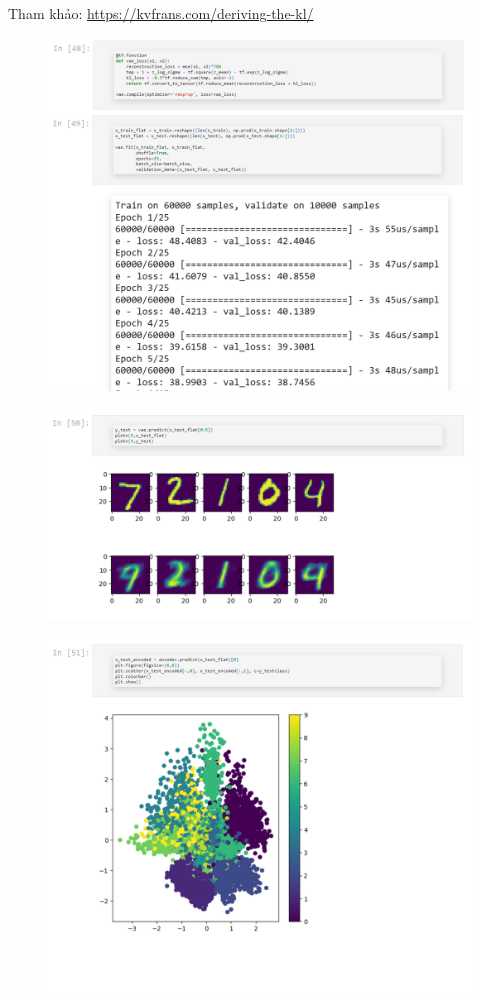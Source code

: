 \documentclass{book}
\begin{document}
Tham khảo: \href{https://kvfrans.com/deriving-the-kl/}{https://kvfrans.com/deriving-the-kl/}
\begin{figure}[H]
	\centering
	\includegraphics[width=0.75\linewidth]{images/au22.png}
\end{figure}
\begin{figure}[H]
	\centering
	\includegraphics[width=0.75\linewidth]{images/au23.png}
\end{figure}
\begin{figure}[H]
	\centering
	\includegraphics[width=0.75\linewidth]{images/au24.png}
\end{figure}
\end{document}
